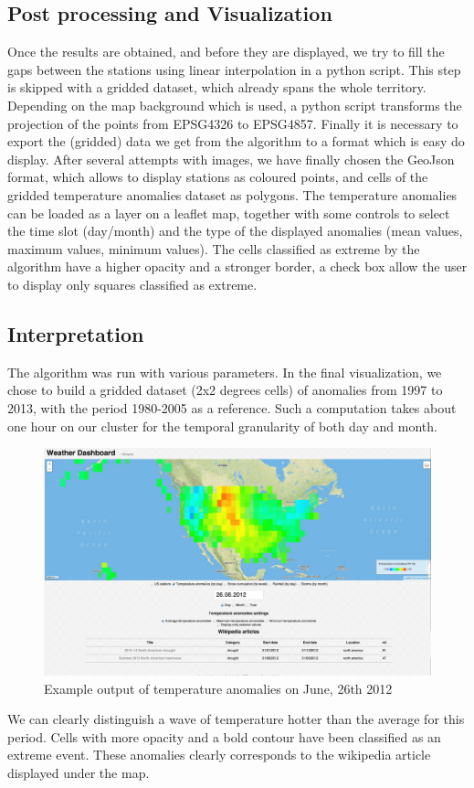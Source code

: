 \subsection{Post processing and Visualization}

Once the results are obtained, and before they are displayed, we try to fill the gaps between the stations using linear interpolation in a python script. This step is skipped with a gridded dataset, which already spans the whole territory.
Depending on the map background which is used, a python script transforms the projection of the points from EPSG4326 to EPSG4857.
Finally it is necessary to export the (gridded) data we get from the algorithm to a format which is easy do display. After several attempts with images, we have finally chosen the GeoJson format, which allows to display stations as coloured points, and cells of the gridded temperature anomalies dataset as polygons.
The temperature anomalies can be loaded as a layer on a leaflet map, together with some controls to select the time slot (day/month) and the type of the displayed anomalies (mean values, maximum values, minimum values).
The cells classified as extreme by the algorithm have a higher opacity and a stronger border, a check box allow the user to display only squares classified as extreme.

\subsection{Interpretation}
The algorithm was run with various parameters. In the final visualization, we chose to build a gridded dataset (2x2 degrees cells) of anomalies from 1997 to 2013, with the period 1980-2005 as a reference. Such a computation takes about one hour on our cluster for the temporal granularity of both day and month.
\begin{figure}[H]
   \includegraphics[scale=0.3]{figures/temperature}
   \caption{Example output of temperature anomalies on June, 26th 2012}
\end{figure}

We can clearly distinguish a wave of temperature hotter than the average for this period. Cells with more opacity and a bold contour have been classified as an extreme event.
These anomalies clearly corresponds to the wikipedia article displayed under the map.
